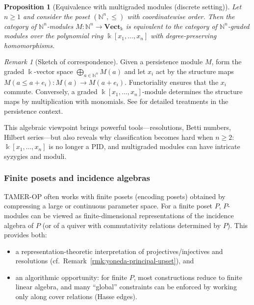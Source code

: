 \documentclass{article}
\newcommand{\kk}{\Bbbk}
\newcommand{\<}{\langle}
\renewcommand{\>}{\rangle}
\newcommand{\bbb}[1]{\ensuremath{\mathbb{#1}}}
\newtheorem*{proposition}{Proposition}
\theoremstyle{definition}
\theoremstyle{remark}
\newtheorem*{remark}{Remark}
\begin{document}
	\begin{proposition}[Equivalence with multigraded modules (discrete setting)]
		\label{prop:graded-module-equivalence}
		Let $n\geq 1$ and consider the poset $(\bbb{N}^n,\leq)$ with coordinatewise order.
		Then the category of $\bbb{N}^n$-modules $M\colon \bbb{N}^n\to \mathbf{Vect}_{\kk}$
		is equivalent to the category of $\bbb{N}^n$-graded modules over the polynomial ring
		$\kk[x_1,\dots,x_n]$ with degree-preserving homomorphisms.
	\end{proposition}
	
	\begin{remark}[Sketch of correspondence]
		Given a persistence module $M$, form the graded $\kk$-vector space
		$\bigoplus_{a\in \bbb{N}^n} M(a)$ and let $x_i$ act by the structure maps
		$M(a\leq a+e_i)\colon M(a)\to M(a+e_i)$.  Functoriality ensures that the $x_i$ commute.
		Conversely, a graded $\kk[x_1,\dots,x_n]$-module determines the structure maps by
		multiplication with monomials.  See \cite{CZ09,Oud15} for
		detailed treatments in the persistence context.
	\end{remark}
	
	This algebraic viewpoint brings powerful tools---resolutions, Betti numbers, Hilbert
	series---but also reveals why classification becomes hard when
	$n\geq 2$: $\kk[x_1,\dots,x_n]$ is no longer a PID, and multigraded modules can have
	intricate syzygies and moduli.
	
	\subsubsection*{Finite posets and incidence algebras}
	
	TAMER-OP often works with finite posets (encoding posets) obtained by compressing a
	large or continuous parameter space.  For a finite poset $P$, $P$-modules can be
	viewed as finite-dimensional representations of the incidence algebra of $P$ (or of a
	quiver with commutativity relations determined by $P$).  This provides both:
	\begin{itemize}
		\item a representation-theoretic interpretation of projectives/injectives and
		resolutions (cf.\ Remark~\ref{rmk:yoneda-principal-upset}), and
		\item an algorithmic opportunity: for finite $P$, most constructions reduce to finite
		linear algebra, and many ``global'' constraints can be enforced by working only
		along cover relations (Hasse edges).
	\end{itemize}
	
\end{document}
